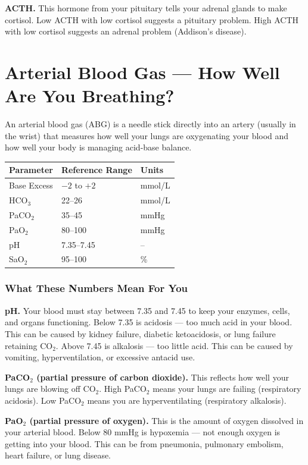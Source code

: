 \textbf{ACTH.} This hormone from your pituitary tells your adrenal glands to make cortisol. Low ACTH with low cortisol suggests a pituitary problem. High ACTH with low cortisol suggests an adrenal problem (Addison's disease).

\clearpage
\section{Arterial Blood Gas --- How Well Are You Breathing?}

An arterial blood gas (ABG) is a needle stick directly into an artery (usually in the wrist) that measures how well your lungs are oxygenating your blood and how well your body is managing acid-base balance.

\begin{longtable}{@{}lll@{}}
\toprule
\textbf{Parameter} & \textbf{Reference Range} & \textbf{Units} \\
\midrule
Base Excess & $-2$ to $+2$ & mmol/L \\
HCO$_3$ & 22--26 & mmol/L \\
PaCO$_2$ & 35--45 & mmHg \\
PaO$_2$ & 80--100 & mmHg \\
pH & 7.35--7.45 & -- \\
SaO$_2$ & 95--100 & \% \\
\bottomrule
\end{longtable}

\subsubsection{What These Numbers Mean For You}

\textbf{pH.} Your blood must stay between 7.35 and 7.45 to keep your enzymes, cells, and organs functioning. Below 7.35 is acidosis --- too much acid in your blood. This can be caused by kidney failure, diabetic ketoacidosis, or lung failure retaining CO$_2$. Above 7.45 is alkalosis --- too little acid. This can be caused by vomiting, hyperventilation, or excessive antacid use.

\textbf{PaCO$_2$ (partial pressure of carbon dioxide).} This reflects how well your lungs are blowing off CO$_2$. High PaCO$_2$ means your lungs are failing (respiratory acidosis). Low PaCO$_2$ means you are hyperventilating (respiratory alkalosis).

\textbf{PaO$_2$ (partial pressure of oxygen).} This is the amount of oxygen dissolved in your arterial blood. Below 80 mmHg is hypoxemia --- not enough oxygen is getting into your blood. This can be from pneumonia, pulmonary embolism, heart failure, or lung disease.

